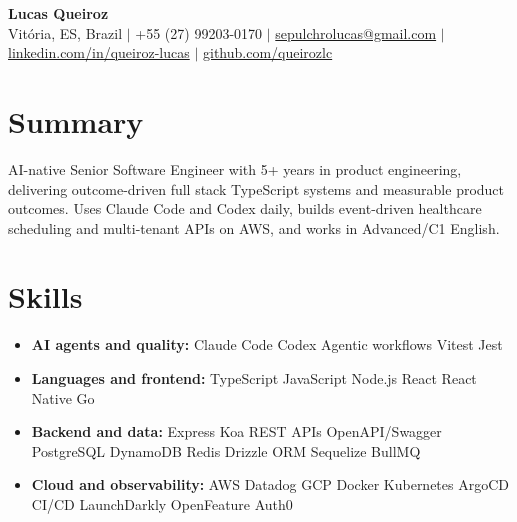 \documentclass[letterpaper,10pt]{article}
\newcommand{\resumeItem}[1]{\item\small{#1}}
\newcommand{\resumeSubHeadingList}{\begin{itemize}[leftmargin=0.15in, label={}, nosep]}
\newcommand{\resumeSubHeadingListEnd}{\end{itemize}}
\begin{document}
\begin{center}
  \textbf{\Huge Lucas Queiroz} \\[3pt]
  \small Vit\'oria, ES, Brazil $|$ +55 (27) 99203-0170 $|$ \href{mailto:sepulchrolucas@gmail.com}{sepulchrolucas@gmail.com} $|$
  \href{https://linkedin.com/in/queiroz-lucas}{linkedin.com/in/queiroz-lucas} $|$
  \href{https://github.com/queirozlc}{github.com/queirozlc}
\end{center}
\vspace{2pt}

\section{Summary}
AI-native Senior Software Engineer with 5+ years in product engineering, delivering outcome-driven full stack TypeScript systems and measurable product outcomes. Uses Claude Code and Codex daily, builds event-driven healthcare scheduling and multi-tenant APIs on AWS, and works in Advanced/C1 English.

\section{Skills}
\resumeSubHeadingList
\resumeItem{\textbf{AI agents and quality:} Claude Code \textbar{} Codex \textbar{} Agentic workflows \textbar{} Vitest \textbar{} Jest}
\resumeItem{\textbf{Languages and frontend:} TypeScript \textbar{} JavaScript \textbar{} Node.js \textbar{} React \textbar{} React Native \textbar{} Go}
\resumeItem{\textbf{Backend and data:} Express \textbar{} Koa \textbar{} REST APIs \textbar{} OpenAPI/Swagger \textbar{} PostgreSQL \textbar{} DynamoDB \textbar{} Redis \textbar{} Drizzle ORM \textbar{} Sequelize \textbar{} BullMQ}
\resumeItem{\textbf{Cloud and observability:} AWS \textbar{} Datadog \textbar{} GCP \textbar{} Docker \textbar{} Kubernetes \textbar{} ArgoCD \textbar{} CI/CD \textbar{} LaunchDarkly \textbar{} OpenFeature \textbar{} Auth0}
\resumeSubHeadingListEnd
\end{document}
